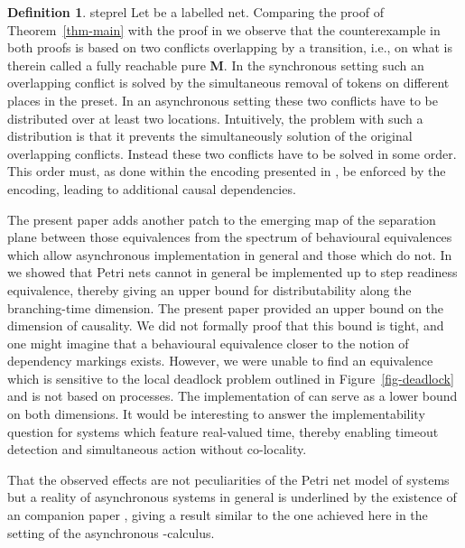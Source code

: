 \documentclass[submission,copyright,creativecommons]{eptcs}
\theoremstyle{definition}
\newtheorem{definition}{Definition}
\def\theoremname{Theorem}
\newcommand{\refthm}[1]{\theoremname~\ref{thm-#1}}
\def\figurename{Figure}
\newcommand{\reffig}[1]{\figurename~\ref{fig-#1}}
\begin{document}
\begin{definition}{steprel}{
  Let  be a labelled net.
  }
Comparing the proof of \refthm{main} with the proof in
\cite{glabbeek08syncasyncinteraction} we observe that the counterexample in
both proofs is based on two conflicts overlapping by a transition, i.e., on what is
therein called a
fully reachable pure \textbf{M}. In the synchronous setting such an overlapping
conflict is solved by the simultaneous removal of tokens on different places in
the preset. In an asynchronous setting these two conflicts have to be
distributed over at least two locations. Intuitively, the problem with such a
distribution is that it prevents the simultaneously solution of the original
overlapping conflicts. Instead these two conflicts have to be solved
in some order. This order must, as done within the encoding presented in
\cite{schicke09synchrony}, be enforced by the encoding,
leading to additional causal dependencies.

The present paper adds another patch to the emerging map of the separation plane
between those equivalences from the spectrum of behavioural equivalences which allow
asynchronous implementation in general and those which do not.
In \cite{glabbeek08syncasyncinteraction} we showed that Petri nets cannot in general be
implemented up to step readiness equivalence, thereby giving an upper bound for distributability
along the branching-time dimension. The present paper provided an upper bound on
the dimension of causality.
We did not formally proof that this bound is tight, and one might imagine that a
behavioural equivalence closer to the notion of dependency markings exists. However,
we were unable to find an equivalence which is sensitive to the local deadlock
problem outlined in \reffig{deadlock} and is not based on processes.
The implementation of \cite{schicke09synchrony} can
serve as a lower bound on both dimensions.
It would be interesting to answer
the implementability question for systems which feature real-valued time, thereby
enabling timeout detection and simultaneous action without co-locality.

That the observed effects are not peculiarities of the Petri net model of systems but
a reality of asynchronous systems in general is underlined by the existence of an
companion paper \cite{peters11asynchronouspi}, giving a result similar to the one
achieved here in the setting of the asynchronous -calculus.


\end{definition}
\end{document}

